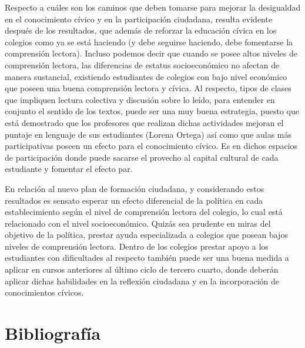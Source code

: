 \documentclass[12pt,twoside]{templates/facsothesis}
\begin{document}
Respecto a cuáles son los caminos que deben tomarse para mejorar la desigualdad en el conocimiento cívico y en la participación ciudadana, resulta evidente después de los resultados, que además de reforzar la educación cívica en los colegios como ya se está haciendo (y debe seguirse haciendo, debe fomentarse la comprensión lectora). Incluso podemos decir que cuando se posee altos niveles de comprensión lectora, las diferencias de estatus socioeconómico no afectan de manera sustancial, existiendo estudiantes de colegios con bajo nivel económico que poseen una buena comprensión lectora y cívica. Al respecto, tipos de clases que impliquen lectura colectiva y discusión sobre lo leído, para entender en conjunto el sentido de los textos, puede ser una muy buena estrategia, puesto que está demostrado que los profesores que realizan dichas actividades mejoran el puntaje en lenguaje de sus estudiantes (Lorena Ortega) así como que aulas más participativas poseen un efecto para el conocimiento cívico. Es en dichos espacios de participación donde puede sacarse el provecho al capital cultural de cada estudiante y fomentar el efecto par.

En relación al nuevo plan de formación ciudadana, y considerando estos resultados es sensato esperar un efecto diferencial de la política en cada establecimiento según el nivel de comprensión lectora del colegio, lo cual está relacionado con el nivel socioeconómico. Quizás sea prudente en miras del objetivo de la política, prestar ayuda especializada a colegios que posean bajos niveles de comprensión lectora. Dentro de los colegios prestar apoyo a los estudiantes con dificultades al respecto también puede ser una buena medida a aplicar en cursos anteriores al último ciclo de tercero cuarto, donde deberán aplicar dichas habilidades en la reflexión ciudadana y en la incorporación de conocimientos cívicos.

\hypertarget{bibliografuxeda}{%
\chapter*{Bibliografía}\label{bibliografuxeda}}



\end{document}

